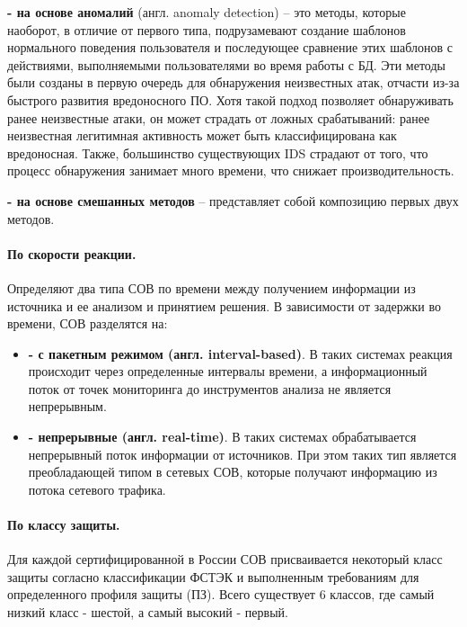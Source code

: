 \textbf{- на основе аномалий} (англ. anomaly detection) -- это методы, которые наоборот, в отличие от первого типа, подрузамевают создание шаблонов нормального поведения пользователя и последующее сравнение этих шаблонов с действиями, выполняемыми пользователями во время работы с БД. Эти методы были созданы в первую очередь для обнаружения неизвестных атак, отчасти из-за быстрого развития вредоносного ПО. Хотя такой подход позволяет обнаруживать ранее неизвестные атаки, он может страдать от ложных срабатываний: ранее неизвестная легитимная активность может быть классифицирована как вредоносная. Также, большинство существующих IDS страдают от того, что процесс обнаружения занимает много времени, что снижает производительность. 

\textbf{- на основе смешанных методов} -- представляет собой композицию первых двух методов.

\paragraph*{По скорости реакции.}

Определяют два типа СОВ по времени между получением информации из источника и ее
анализом и принятием решения. В зависимости от задержки во времени, СОВ разделятся на:
\begin{itemize}
	\item \textbf{- с пакетным режимом (англ. interval-based)}. В таких системах реакция
	происходит через определенные интервалы времени, а информационный поток от точек
	мониторинга до инструментов анализа не является непрерывным.

	\item \textbf{- непрерывные (англ. real-time)}. В таких системах обрабатывается
	непрерывный поток информации от источников. При этом таких тип является преобладающей
	типом в сетевых СОВ, которые получают информацию из потока сетевого трафика.
\end{itemize}


\paragraph*{По классу защиты.}

Для каждой сертифицированной в России СОВ присваивается некоторый класс защиты
согласно классификации ФСТЭК и выполненным требованиям для определенного профиля защиты (ПЗ).
Всего существует 6 классов, где самый низкий класс - шестой, а самый высокий - первый.

